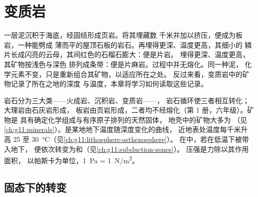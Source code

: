 \chapter{变质岩}\label{ch:g12:metamorphic-rocks}

一层泥沉积于海底，经固结形成页岩。将其埋藏数
千米并加以挤压，便成为板岩，一种能劈成
薄而平的屋顶石板的岩石。再埋得更深、温度更高，其细小的
鳞片长成闪亮的云母，其间红色的石榴石膨大：便是片岩。
埋得更深、温度更高，其矿物按浅色与深色
排列成条带：便是片麻岩。过程中并无熔化。同一种泥，
化学元素不变，只是重新组合其矿物，以适应所在之处。
反过来看，变质岩中的矿物记录了所在之地的深度
与温度，本章将学习如何读取这些记录。

\begin{recall}
岩石分为三大类——火成岩、沉积岩、变质岩——，
岩石循环使三者相互转化；大理岩由石灰岩形成，
板岩由页岩形成，二者均不经熔化（第 1 册，六年级）。矿物是
具有确定化学组成与有序原子排列的天然固体，
地壳中的矿物大多为
（见\cref{ch:g11:minerals}）。是某地地下温度随深度变化的曲线，
近地表处温度每千米升高 25 至
\qty{30}{\celsius}（见\cref{ch:g11:lithosphere-asthenosphere}）。
在中，若在低温下被带入地下，
便依次转变为和（见\cref{ch:g11:subduction-zones}）。
压强是力除以其作用面积，
以帕斯卡为单位，\qty{1}{Pa} = \qty{1}{N/m^2}。
\end{recall}

\section{固态下的转变}

